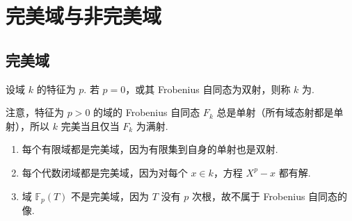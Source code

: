 \section{完美域与非完美域}\label{sec:galois-2-6}
\subsection{完美域}\label{sec:galois-2-6-1}
\begin{definition*}
设域 $k$ 的特征为 $p$. 若 $p=0$，或其 Frobenius 自同态为双射，则称 $k$ 为.
\end{definition*}
注意，特征为 $p>0$ 的域的 Frobenius 自同态 $F_k$ 总是单射（所有域态射都是单射），所以 $k$ 完美当且仅当 $F_k$ 为满射.
\begin{example*}
\begin{enumerate}[label=\roman*)]
\item 每个有限域都是完美域，因为有限集到自身的单射也是双射.
\item 每个代数闭域都是完美域，因为对每个 $x\in k$，方程 $X^p-x$ 都有解.
\item 域 $\mathbb F_p(T)$ 不是完美域，因为 $T$ 没有 $p$ 次根，故不属于 Frobenius 自同态的像.
\end{enumerate}
\end{example*}
